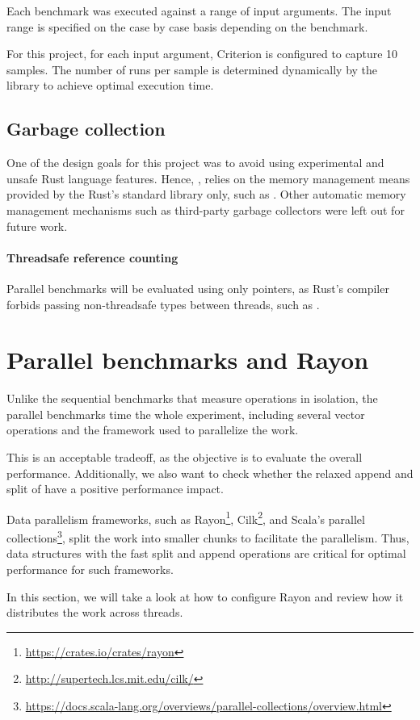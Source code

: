 Each benchmark was executed against a range of input arguments. The input range is specified on the case by case basis depending on the benchmark.

For this project, for each input argument, Criterion is configured to capture 10 samples. The number of runs per sample is determined dynamically by the library to achieve optimal execution time.

\subsection{Garbage collection}
One of the design goals for this project was to avoid using experimental and unsafe Rust language features. Hence, \pvecrs{}, relies on the memory management means provided by the Rust's standard library only, such as \rc{}. Other automatic memory management mechanisms such as third-party garbage collectors were left out for future work.

\paragraph{Threadsafe reference counting}
Parallel benchmarks will be evaluated using only \arc{} pointers, as Rust's compiler forbids passing non-threadsafe types between threads, such as \rc{}.

\section{Parallel benchmarks and Rayon}
Unlike the sequential benchmarks that measure operations in isolation, the parallel benchmarks time the whole experiment, including several vector operations and the framework used to parallelize the work.

This is an acceptable tradeoff, as the objective is to evaluate the overall performance. Additionally, we also want to check whether the relaxed append and split of \rrbvec{} have a positive performance impact.

Data parallelism frameworks, such as Rayon\footnote{\url{https://crates.io/crates/rayon}}, Cilk\footnote{\url{http://supertech.lcs.mit.edu/cilk/}}, and Scala's parallel collections\footnote{\url{https://docs.scala-lang.org/overviews/parallel-collections/overview.html}}, split the work into smaller chunks to facilitate the parallelism. Thus, data structures with the fast split and append operations are critical for optimal performance for such frameworks.

In this section, we will take a look at how to configure Rayon and review how it distributes the work across threads.

